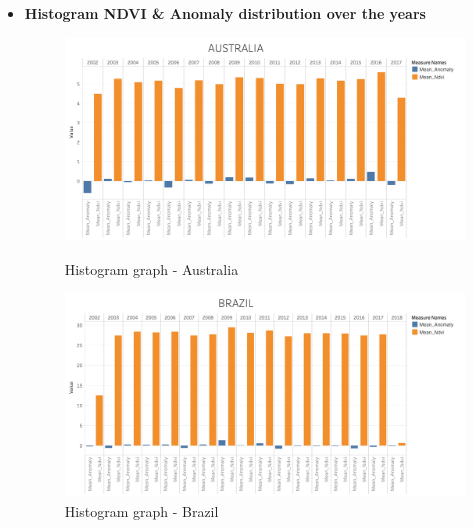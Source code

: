 \begin{itemize}
    \clearpage
    \newpage

    
    \item \textbf{Histogram NDVI \& Anomaly distribution over the years}

    \begin{figure}[!htb]
        \begin{minipage}{0.5\textwidth}
            \centering
            \includegraphics[width=1.0\linewidth]{figures/ch5/Histograms/AUSTRALIA_histogram.png}
            \caption{Histogram graph - Australia}\label{Fig:AUSTRALIA_histogram}
        \end{minipage}\hfill
        \begin{minipage}{0.5\textwidth}
            \centering
            \includegraphics[width=1.0\linewidth]{figures/ch5/Histograms/BRAZIL_histogram.png}
            \caption{Histogram graph - Brazil}\label{Fig:BRAZIL_histogram}
        \end{minipage}
    \end{figure}
    

\end{itemize}
